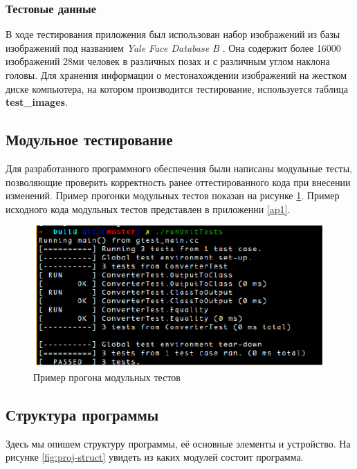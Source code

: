 \subsubsection{Тестовые данные}

В ходе тестирования приложения был использован набор изображений из базы изображений под названием
\textit{Yale Face Database B} \cite{yale_face_database}. Она содержит более 16000 изображений 28ми человек в различных позах
и с различным углом наклона головы. Для хранения информации о местонахождении изображений на жестком диске
компьютера, на котором производится тестирование, используется таблица \textbf{test\_images}.

\subsection{Модульное тестирование}
Для разработанного программного обеспечения были написаны модульные тесты,
позволяющие проверить корректность ранее оттестированного кода при внесении
изменений. Пример прогонки модульных тестов показан на рисунке
\ref{fig:test}. Пример исходного кода модульных тестов представлен в приложенни
\ref{ap1}.

\begin{figure}[hbt]
  \centering
  \includegraphics{tests.png}
  \caption{Пример прогона модульных тестов}
  \label{fig:test}
\end{figure}

\subsection{Структура программы}

Здесь мы опишем структуру программы, её основные элементы и устройство.
На рисунке \ref{fig:proj-struct} увидеть из каких модулей состоит программа.

